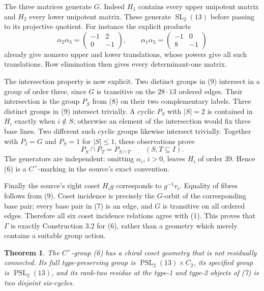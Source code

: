 \documentclass[11pt,a4paper]{article}
\newtheorem{theorem}{Theorem}
\begin{document}
The three matrices generate $G$. Indeed $H_1$ contains every
upper unipotent matrix and $H_2$ every lower unipotent matrix.
These generate $\operatorname{SL}_2(13)$ before passing to its
projective quotient. For instance the explicit products
\[
 \alpha_2\alpha_3=\begin{pmatrix}-1&2\\0&-1\end{pmatrix},
 \qquad
 \alpha_1\alpha_3=\begin{pmatrix}-1&0\\8&-1\end{pmatrix}
\]
already give nonzero upper and lower translations, whose powers
give all such translations. Row elimination then gives every
determinant-one matrix.

The intersection property is now explicit. Two distinct groups
in (9) intersect in a group of order three, since $G$ is transitive
on the $28\cdot13$ ordered edges. Their intersection is the
group $P_S$ from (8) on their two complementary labels. Three
distinct groups in (9) intersect trivially. A cyclic $P_S$ with
$|S|=2$ is contained in $H_i$ exactly when $i\notin S$;
otherwise an element of the intersection would fix three base
lines. Two different such cyclic groups likewise intersect
trivially. Together with $P_I=G$ and $P_S=1$ for $|S|\le1$,
these observations prove
\[
                       P_S\cap P_T=P_{S\cap T}
                       \qquad(S,T\subseteq I).           \tag{10}
\]
The generators are independent: omitting $\alpha_i$, $i>0$,
leaves $H_i$ of order 39. Hence (6) is a $C^+$-marking in the
source's exact convention.

Finally the source's right coset $H_i g$ corresponds to
$g^{-1}v_i$. Equality of fibres follows from (9). Coset
incidence is precisely the $G$-orbit of the corresponding
base pair; every base pair in (7) is an edge, and $G$ is
transitive on all ordered edges. Therefore all six coset
incidence relations agree with (1). This proves that $\Gamma$
is exactly Construction 3.2 for (6), rather than a geometry
which merely contains a suitable group action.

\begin{theorem}
The $C^+$-group (6) has a chiral coset geometry that is not
residually connected. Its full type-preserving group is
$\operatorname{PSL}_2(13)\times C_2$, its specified group is
$\operatorname{PSL}_2(13)$, and its rank-two residue at the
type-1 and type-2 objects of (7) is two disjoint six-cycles.
\end{theorem}
\end{document}
